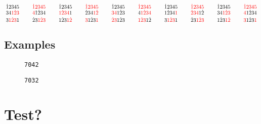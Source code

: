 \documentclass{article}
\begin{document}
\[
\SeqCompare{\dot{1}2345}{\SeqCompare{34\textcolor{red}{1}\textcolor{red}{\dot{2}}\textcolor{red}{3}}{3\textcolor{red}{1}\textcolor{red}{\dot{2}}\textcolor{red}{3}1}}
\qquad
\SeqCompare{\textcolor{red}{\dot{1}}\textcolor{red}{2}\textcolor{red}{3}\textcolor{red}{4}\textcolor{red}{5}}{\SeqCompare{\textcolor{red}{4}1\dot{2}34}{\dot{2}3\textcolor{red}{1}\textcolor{red}{\dot{2}}\textcolor{red}{3}}}
\qquad
\SeqCompare{\dot{1}2345}{\SeqCompare{\textcolor{red}{1}\textcolor{red}{\dot{2}}\textcolor{red}{3}\textcolor{red}{4}1}{1\dot{2}3\textcolor{red}{1}\textcolor{red}{\dot{2}}}}
\qquad
\SeqCompare{\textcolor{red}{\dot{1}}\textcolor{red}{2}\textcolor{red}{3}\textcolor{red}{4}\textcolor{red}{5}}{\SeqCompare{\dot{2}34\textcolor{red}{1}\textcolor{red}{\dot{2}}}{\textcolor{red}{3}1\dot{2}3\textcolor{red}{1}}}
\qquad
\SeqCompare{\dot{1}2345}{\SeqCompare{\textcolor{red}{3}\textcolor{red}{4}1\dot{2}3}{\textcolor{red}{\dot{2}}\textcolor{red}{3}1\dot{2}3}}
\qquad
\SeqCompare{\textcolor{red}{\dot{1}}\textcolor{red}{2}\textcolor{red}{3}\textcolor{red}{4}\textcolor{red}{5}}{\SeqCompare{4\textcolor{red}{1}\textcolor{red}{\dot{2}}\textcolor{red}{3}\textcolor{red}{4}}{\textcolor{red}{1}\textcolor{red}{\dot{2}}\textcolor{red}{3}1\dot{2}}}
\qquad
\SeqCompare{\dot{1}2345}{\SeqCompare{1\dot{2}34\textcolor{red}{1}}{3\textcolor{red}{1}\textcolor{red}{\dot{2}}\textcolor{red}{3}1}}
\qquad
\SeqCompare{\textcolor{red}{\dot{1}}\textcolor{red}{2}\textcolor{red}{3}\textcolor{red}{4}\textcolor{red}{5}}{\SeqCompare{\textcolor{red}{\dot{2}}\textcolor{red}{3}\textcolor{red}{4}1\dot{2}}{\dot{2}3\textcolor{red}{1}\textcolor{red}{\dot{2}}\textcolor{red}{3}}}
\qquad
\SeqCompare{\dot{1}2345}{\SeqCompare{34\textcolor{red}{1}\textcolor{red}{\dot{2}}\textcolor{red}{3}}{1\dot{2}3\textcolor{red}{1}\textcolor{red}{\dot{2}}}}
\qquad
\SeqCompare{\textcolor{red}{\dot{1}}\textcolor{red}{2}\textcolor{red}{3}\textcolor{red}{4}\textcolor{red}{5}}{\SeqCompare{\textcolor{red}{4}1\dot{2}34}{\textcolor{red}{3}1\dot{2}3\textcolor{red}{1}}}
\]

% 
% 

\clearpage

\subsection{Examples}
\begin{figure}[h]

\caption{\texttt{7042}}
\end{figure}

\begin{figure}[h]

\caption{\texttt{7032}}
\end{figure}


\clearpage

\section{Test?}
\end{document}

